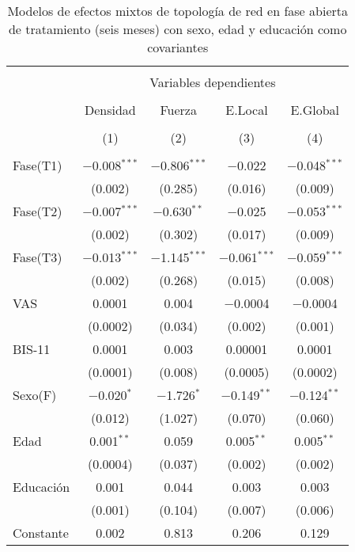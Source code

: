 \begin{table}[!htbp] \centering
  \caption{Modelos de efectos mixtos de topología de red en fase abierta de tratamiento (seis meses) con sexo, edad y educación como covariantes}
  \label{}
\begin{tabular}{@{\extracolsep{5pt}}lcccc}
\\[-1.8ex]\hline
\hline \\[-1.8ex]
 & \multicolumn{4}{c}{Variables dependientes} \\
\cline{2-5}
\\[-1.8ex] & Densidad & Fuerza & E.Local & E.Global \\
\\[-1.8ex] & (1) & (2) & (3) & (4)\\
\hline \\[-1.8ex]
 Fase(T1) & $-$0.008$^{***}$ & $-$0.806$^{***}$ & $-$0.022 & $-$0.048$^{***}$ \\
  & (0.002) & (0.285) & (0.016) & (0.009) \\
  Fase(T2) & $-$0.007$^{***}$ & $-$0.630$^{**}$ & $-$0.025 & $-$0.053$^{***}$ \\
  & (0.002) & (0.302) & (0.017) & (0.009) \\
  Fase(T3) & $-$0.013$^{***}$ & $-$1.145$^{***}$ & $-$0.061$^{***}$ & $-$0.059$^{***}$ \\
  & (0.002) & (0.268) & (0.015) & (0.008) \\
  VAS & 0.0001 & 0.004 & $-$0.0004 & $-$0.0004 \\
  & (0.0002) & (0.034) & (0.002) & (0.001) \\
  BIS-11 & 0.0001 & 0.003 & 0.00001 & 0.0001 \\
  & (0.0001) & (0.008) & (0.0005) & (0.0002) \\
  Sexo(F) & $-$0.020$^{*}$ & $-$1.726$^{*}$ & $-$0.149$^{**}$ & $-$0.124$^{**}$ \\
  & (0.012) & (1.027) & (0.070) & (0.060) \\
  Edad & 0.001$^{**}$ & 0.059 & 0.005$^{**}$ & 0.005$^{**}$ \\
  & (0.0004) & (0.037) & (0.002) & (0.002) \\
  Educación & 0.001 & 0.044 & 0.003 & 0.003 \\
  & (0.001) & (0.104) & (0.007) & (0.006) \\
  Constante & 0.002 & 0.813 & 0.206 & 0.129 \\

\end{tabular}
\end{table}
